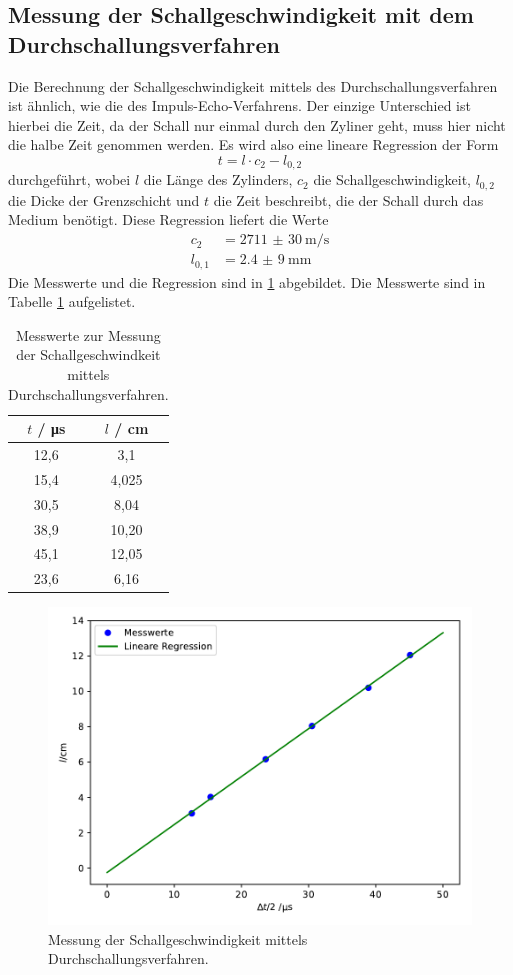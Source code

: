 \subsection{Messung der Schallgeschwindigkeit mit dem Durchschallungsverfahren}
Die Berechnung der Schallgeschwindigkeit mittels des Durchschallungsverfahren ist ähnlich, wie die des Impuls-Echo-Verfahrens. Der einzige Unterschied ist hierbei
die Zeit, da der Schall nur einmal durch den Zyliner geht, muss hier nicht die halbe Zeit genommen werden.
Es wird also eine lineare Regression der Form
\begin{equation*}
  t = l \cdot c_2 -l_{0,2}
\end{equation*}
durchgeführt, wobei $l$ die Länge des Zylinders, $c_2$ die Schallgeschwindigkeit, $l_{0,2}$ die Dicke der Grenzschicht und $t$ die Zeit beschreibt, die
der Schall durch das Medium benötigt. Diese Regression liefert die Werte
\begin{align*}
  c_2 &= \SI{2711(30)}{\meter\per\second} \\
  l_{0,1} &= \SI{2,4(9)}{\milli\meter}
\end{align*}
Die Messwerte und die Regression sind in \ref{abb:4} abgebildet. Die Messwerte sind in Tabelle \ref{tab:3} aufgelistet.
\begin{table}
  \centering
  \caption{Messwerte zur Messung der Schallgeschwindkeit mittels Durchschallungsverfahren.}
  \label{tab:3}
  \begin{tabular}{c c}
    \toprule
    $t$ / \si{\micro\second} & $l$ / \si{\centi\meter} \\
    \midrule
    12,6  &  3,1 \\
    15,4  &  4,025 \\
    30,5  &  8,04 \\
    38,9  &  10,20 \\
    45,1  &  12,05 \\
    23,6  &  6,16 \\
    \bottomrule
  \end{tabular}
\end{table}
\begin{figure}
  \centering
  \includegraphics[scale=0.7]{Schallgeschwindigkeit.pdf}
  \caption{Messung der Schallgeschwindigkeit mittels Durchschallungsverfahren.}
  \label{abb:4}
\end{figure}

